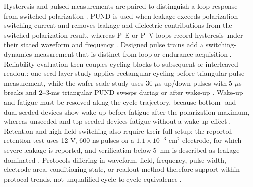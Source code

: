 \documentclass[11pt,a4paper]{report}
\begin{document}
Hysteresis and pulsed measurements are paired to distinguish a loop response from switched polarization \cite{song2021ferro,schroeder2023road}. PUND is used when leakage exceeds polarization-switching current and removes leakage and dielectric contributions from the switched-polarization result, whereas P--E or P--V loops record hysteresis under their stated waveform and frequency \cite{song2021ferro,schroeder2023road,kim2020tin,neuber2022peald}. Designed pulse trains add a switching-dynamics measurement that is distinct from loop or endurance acquisition \cite{liu2025zrrich}. Reliability evaluation then couples cycling blocks to subsequent or interleaved readout: one seed-layer study applies rectangular cycling before triangular-pulse measurement, while the wafer-scale study uses 30-$\mu$s up/down pulses with 5-$\mu$s breaks and 2--3-ms triangular PUND sweeps during or after wake-up \cite{park2023seed,kaatranen2026unif}. Wake-up and fatigue must be resolved along the cycle trajectory, because bottom- and dual-seeded devices show wake-up before fatigue after the polarization maximum, whereas unseeded and top-seeded devices fatigue without a wake-up effect \cite{park2023seed}. Retention and high-field switching also require their full setup: the reported retention test uses 12-V, 600-ns pulses on a $1.1\times10^{-3}$-cm$^2$ electrode, for which severe leakage is reported, and verification below 5~nm is described as leakage dominated \cite{kim2014inductive,mikolajick2018mrs}. Protocols differing in waveform, field, frequency, pulse width, electrode area, conditioning state, or readout method therefore support within-protocol trends, not unqualified cycle-to-cycle equivalence \cite{park2023seed,kim2014inductive,kaatranen2026unif,liu2025zrrich}.
\end{document}
